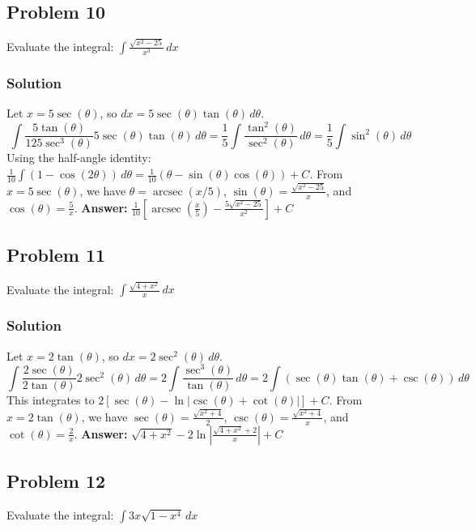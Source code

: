 \documentclass{article}
\begin{document}
\subsection{Problem 10}
Evaluate the integral: $ \int \frac{\sqrt{x^2 - 25}}{x^3} \,dx $
\subsubsection*{Solution}
Let $ x = 5 \sec(\theta) $, so $ dx = 5 \sec(\theta)\tan(\theta) \,d\theta $.
\[ \int \frac{5\tan(\theta)}{125\sec^3(\theta)} 5\sec(\theta)\tan(\theta) \,d\theta = \frac{1}{5} \int \frac{\tan^2(\theta)}{\sec^2(\theta)} \,d\theta = \frac{1}{5} \int \sin^2(\theta) \,d\theta \]
Using the half-angle identity: $ \frac{1}{10} \int (1 - \cos(2\theta)) \,d\theta = \frac{1}{10}(\theta - \sin(\theta)\cos(\theta)) + C $.
From $ x=5\sec(\theta) $, we have $ \theta=\operatorname{arcsec}(x/5) $, $ \sin(\theta)=\frac{\sqrt{x^2-25}}{x} $, and $ \cos(\theta)=\frac{5}{x} $.
\textbf{Answer:} $ \frac{1}{10}\left[\operatorname{arcsec}\left(\frac{x}{5}\right) - \frac{5\sqrt{x^2-25}}{x^2}\right] + C $
 

\subsection{Problem 11}
Evaluate the integral: $ \int \frac{\sqrt{4 + x^2}}{x} \,dx $
\subsubsection*{Solution}
Let $ x = 2 \tan(\theta) $, so $ dx = 2 \sec^2(\theta) \,d\theta $.
\[ \int \frac{2\sec(\theta)}{2\tan(\theta)} 2\sec^2(\theta) \,d\theta = 2 \int \frac{\sec^3(\theta)}{\tan(\theta)} \,d\theta = 2 \int (\sec(\theta)\tan(\theta) + \csc(\theta)) \,d\theta \]
This integrates to $ 2[\sec(\theta) - \ln|\csc(\theta) + \cot(\theta)|] + C $.
From $ x=2\tan(\theta) $, we have $ \sec(\theta)=\frac{\sqrt{x^2+4}}{2} $, $ \csc(\theta)=\frac{\sqrt{x^2+4}}{x} $, and $ \cot(\theta)=\frac{2}{x} $.
\textbf{Answer:} $ \sqrt{4+x^2} - 2\ln\left|\frac{\sqrt{4+x^2}+2}{x}\right| + C $
 

\subsection{Problem 12}
Evaluate the integral: $ \int 3x\sqrt{1 - x^4} \,dx $
\end{document}
